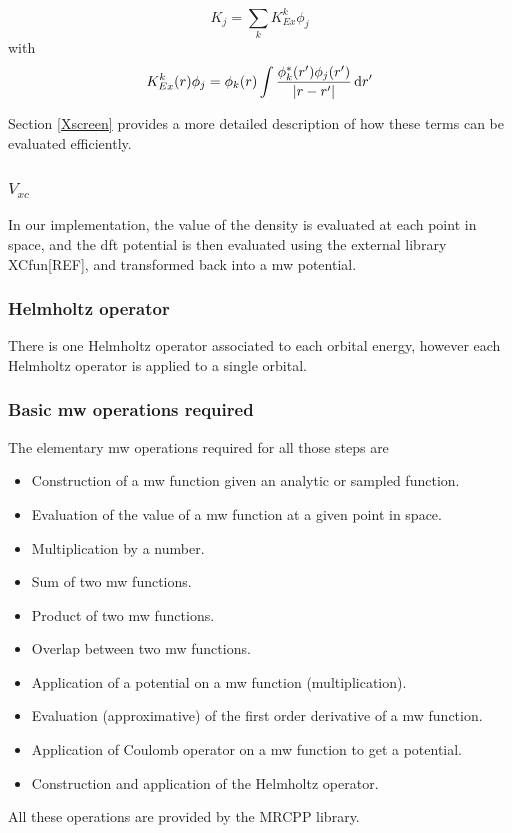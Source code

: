 \documentclass{article}
\begin{document}
\begin{equation}
  K_{j} = \sum_k  K_{Ex}^k \phi_j 
\end{equation}
with 
\begin{equation}
  K_{Ex}^k(r) \phi_j = \phi_k(r) \int \frac{\phi^*_k(r')\phi_j(r')}{|r-r'|} \,\mathrm{d} r'
\end{equation}

Section \ref{Xscreen} provides a more detailed description of how these terms can be evaluated efficiently. 

\subsubsection{$V_{xc}$}
In our implementation, the value of the density is evaluated at each point in space, and the dft potential is then evaluated using the external library XCfun[REF], and transformed back into a mw potential. 

\subsubsection{Helmholtz operator}

There is one Helmholtz operator associated to each orbital energy, however each Helmholtz operator is applied to a single orbital.


\subsubsection{Basic mw operations required}

The elementary mw operations required for all those steps are
\begin{itemize}
\item Construction of a mw function given an analytic or sampled function.
\item Evaluation of the value of a mw function at a given point in space.
\item Multiplication by a number.
\item Sum of two mw functions.
\item Product of two mw functions.
\item Overlap between two mw functions.
\item Application of a potential on a mw function (multiplication).
\item Evaluation (approximative) of the first order derivative of a mw function.
\item Application of Coulomb operator on a mw function to get a potential.
\item Construction and application of the Helmholtz operator.
\end{itemize}
All these operations are provided by the MRCPP library.
\end{document}
